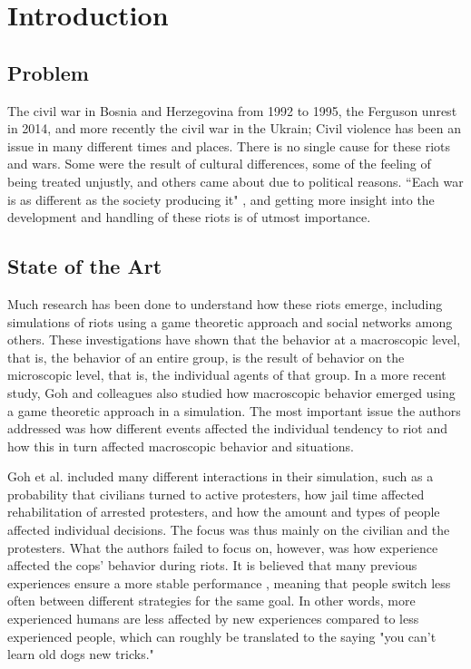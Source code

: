 \section{Introduction}
\subsection{Problem}
The civil war in Bosnia and Herzegovina from 1992 to 1995, the Ferguson unrest in 2014, and more recently the civil war in the Ukrain; Civil violence has been an issue in many different times and places. There is no single cause for these riots and wars. Some were the result of cultural differences, some of the feeling of being treated unjustly, and others came about due to political reasons. ``Each war is as different as the society producing it" \citep*{sambanis2001ethnic}, and getting more insight into the development and handling of these riots is of utmost importance. 

\subsection{State of the Art}
Much research has been done to understand how these riots emerge, including simulations of riots using a game theoretic approach \citep*{myerson1991game} and social networks \citep*{gulden2002spatial} among others. These investigations have shown that the behavior at a macroscopic level, that is, the behavior of an entire group, is the result of behavior on the microscopic level, that is, the individual agents of that group. In a more recent study, Goh and colleagues \citep*{goh2006modeling} also studied how macroscopic behavior emerged using a game theoretic approach in a simulation. The most important issue the authors addressed was how different events affected the individual tendency to riot and how this in turn affected macroscopic behavior and situations. 

Goh et al. included many different interactions in their simulation, such as a probability that civilians turned to active protesters, how jail time affected rehabilitation of arrested protesters, and how the amount and types of people affected individual decisions. The focus was thus mainly on the civilian and the protesters. What the authors failed to focus on, however, was how experience affected the cops' behavior during riots. It is believed that many previous experiences ensure a more stable performance \citep{anderson2007mind,nason2005soar}, meaning that people switch less often between different strategies for the same goal. In other words, more experienced humans are less affected by new experiences compared to less experienced people, which can roughly be translated to the saying "you can't learn old dogs new tricks." 

